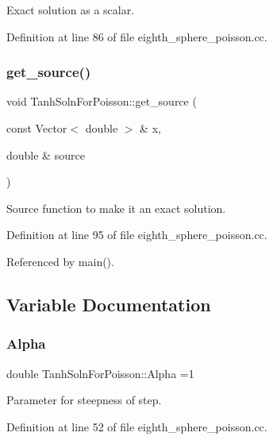 Exact solution as a scalar. 



Definition at line 86 of file eighth\+\_\+sphere\+\_\+poisson.\+cc.

\mbox{\label{namespaceTanhSolnForPoisson_ae1b9d6789ff301e3d63a4e292213036c}} 
\subsubsection{\texorpdfstring{get\+\_\+source()}{get\_source()}}
{\footnotesize\ttfamily void Tanh\+Soln\+For\+Poisson\+::get\+\_\+source (\begin{DoxyParamCaption}\item[{const Vector$<$ double $>$ \&}]{x,  }\item[{double \&}]{source }\end{DoxyParamCaption})}



Source function to make it an exact solution. 



Definition at line 95 of file eighth\+\_\+sphere\+\_\+poisson.\+cc.



Referenced by main().



\subsection{Variable Documentation}
\mbox{\label{namespaceTanhSolnForPoisson_ae676ccd186d5df119cce811596d949c1}} 
\subsubsection{\texorpdfstring{Alpha}{Alpha}}
{\footnotesize\ttfamily double Tanh\+Soln\+For\+Poisson\+::\+Alpha =1}



Parameter for steepness of step. 



Definition at line 52 of file eighth\+\_\+sphere\+\_\+poisson.\+cc.



